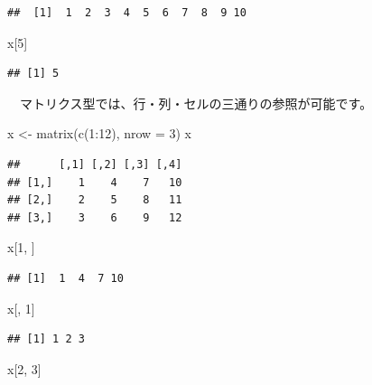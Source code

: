 \documentclass[
  12pt,
]{book}
\newenvironment{Shaded}{\begin{snugshade}}{\end{snugshade}}
\newcommand{\AttributeTok}[1]{\textcolor[rgb]{0.77,0.63,0.00}{#1}}
\newcommand{\DecValTok}[1]{\textcolor[rgb]{0.00,0.00,0.81}{#1}}
\newcommand{\FunctionTok}[1]{\textcolor[rgb]{0.00,0.00,0.00}{#1}}
\newcommand{\NormalTok}[1]{#1}
\newcommand{\OtherTok}[1]{\textcolor[rgb]{0.56,0.35,0.01}{#1}}
\newcommand{\SpecialCharTok}[1]{\textcolor[rgb]{0.00,0.00,0.00}{#1}}
\begin{document}
\begin{verbatim}
##  [1]  1  2  3  4  5  6  7  8  9 10
\end{verbatim}

\begin{Shaded}
\begin{Highlighting}[]
\NormalTok{x[}\DecValTok{5}\NormalTok{]}
\end{Highlighting}
\end{Shaded}

\begin{verbatim}
## [1] 5
\end{verbatim}

　マトリクス型では、行・列・セルの三通りの参照が可能です。

\begin{Shaded}
\begin{Highlighting}[]
\NormalTok{x }\OtherTok{\textless{}{-}} \FunctionTok{matrix}\NormalTok{(}\FunctionTok{c}\NormalTok{(}\DecValTok{1}\SpecialCharTok{:}\DecValTok{12}\NormalTok{), }\AttributeTok{nrow =} \DecValTok{3}\NormalTok{)}
\NormalTok{x}
\end{Highlighting}
\end{Shaded}

\begin{verbatim}
##      [,1] [,2] [,3] [,4]
## [1,]    1    4    7   10
## [2,]    2    5    8   11
## [3,]    3    6    9   12
\end{verbatim}

\begin{Shaded}
\begin{Highlighting}[]
\NormalTok{x[}\DecValTok{1}\NormalTok{, ]}
\end{Highlighting}
\end{Shaded}

\begin{verbatim}
## [1]  1  4  7 10
\end{verbatim}

\begin{Shaded}
\begin{Highlighting}[]
\NormalTok{x[, }\DecValTok{1}\NormalTok{]}
\end{Highlighting}
\end{Shaded}

\begin{verbatim}
## [1] 1 2 3
\end{verbatim}

\begin{Shaded}
\begin{Highlighting}[]
\NormalTok{x[}\DecValTok{2}\NormalTok{, }\DecValTok{3}\NormalTok{]}
\end{Highlighting}
\end{Shaded}
\end{document}
